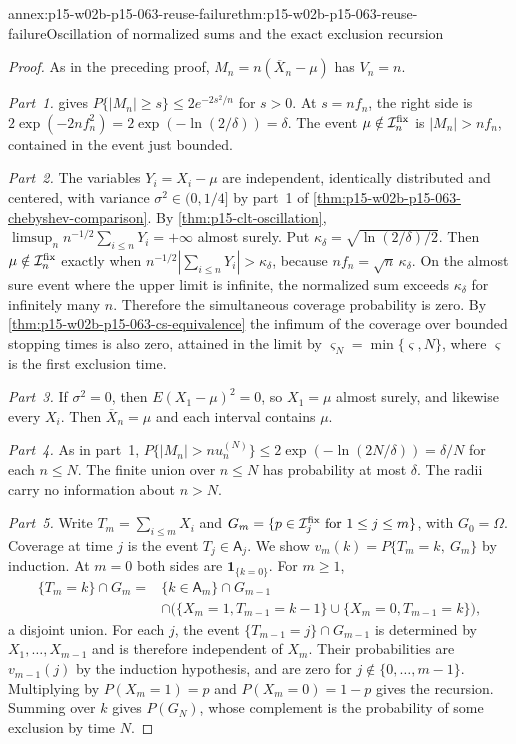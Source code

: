 \begin{annexitem}{annex:p15-w02b-p15-063-reuse-failure}{thm:p15-w02b-p15-063-reuse-failure}{Oscillation of normalized sums and the exact exclusion recursion}
\begin{proof}
As in the preceding proof, \(M_n=n(\overline X_n-\mu)\) has
\(V_n=n\).

\emph{Part~1.}  gives
\(P\{|M_n|\geq s\}\leq2e^{-2s^2/n}\) for \(s>0\). At \(s=nf_n\), the
right side is \(2\exp(-2nf_n^2)=2\exp(-\ln(2/\delta))=\delta\). The event
\(\mu\notin\mathcal I^{\rm fix}_n\) is \(|M_n|>nf_n\), contained in the
event just bounded.

\emph{Part~2.} The variables \(Y_i=X_i-\mu\) are independent, identically
distributed and centered, with variance \(\sigma^2\in(0,1/4]\) by part~1
of \cref{thm:p15-w02b-p15-063-chebyshev-comparison}. By
\cref{thm:p15-clt-oscillation},
\(\limsup_n n^{-1/2}\sum_{i\leq n}Y_i=+\infty\) almost surely. Put
\(\kappa_\delta=\sqrt{\ln(2/\delta)/2}\). Then
\(\mu\notin\mathcal I^{\rm fix}_n\) exactly when
\(n^{-1/2}|\sum_{i\leq n}Y_i|>\kappa_\delta\), because
\(nf_n=\sqrt n\,\kappa_\delta\). On the almost sure event where the upper
limit is infinite, the normalized sum exceeds \(\kappa_\delta\) for
infinitely many \(n\). Therefore the simultaneous coverage probability
is zero. By \cref{thm:p15-w02b-p15-063-cs-equivalence} the infimum of the
coverage over bounded stopping times is also zero, attained in the limit
by \(\varsigma_N=\min\{\varsigma,N\}\), where \(\varsigma\) is the first
exclusion time.

\emph{Part~3.} If \(\sigma^2=0\), then \(E(X_1-\mu)^2=0\), so
\(X_1=\mu\) almost surely, and likewise every \(X_i\). Then
\(\overline X_n=\mu\) and each interval contains \(\mu\).

\emph{Part~4.} As in part~1, \(P\{|M_n|>nu_n^{(N)}\}\leq
2\exp(-\ln(2N/\delta))=\delta/N\) for each \(n\leq N\). The finite union
over \(n\leq N\) has probability at most \(\delta\). The radii carry no
information about \(n>N\).

\emph{Part~5.} Write \(T_m=\sum_{i\leq m}X_i\) and
\(G_m=\{p\in\mathcal I^{\rm fix}_j\text{ for }1\leq j\leq m\}\), with
\(G_0=\Omega\). Coverage at time \(j\) is the event \(T_j\in\mathsf A_j\).
We show \(v_m(k)=P\{T_m=k,\ G_m\}\) by induction. At \(m=0\) both sides
are \(\mathbf1_{\{k=0\}}\). For \(m\geq1\),
\[
\begin{split}
 \{T_m=k\}\cap G_m={}&\{k\in\mathsf A_m\}\cap G_{m-1}\\
 &\cap\bigl(\{X_m=1,T_{m-1}=k-1\}\cup\{X_m=0,T_{m-1}=k\}\bigr),
\end{split}
\]
a disjoint union. For each \(j\), the event
\(\{T_{m-1}=j\}\cap G_{m-1}\) is determined by \(X_1,\ldots,X_{m-1}\) and
is therefore independent of \(X_m\). Their probabilities are
\(v_{m-1}(j)\) by the induction hypothesis, and are zero for
\(j\notin\{0,\ldots,m-1\}\). Multiplying by \(P(X_m=1)=p\) and
\(P(X_m=0)=1-p\) gives the recursion. Summing over \(k\) gives
\(P(G_N)\), whose complement is the probability of some exclusion by
time \(N\).
\end{proof}
\end{annexitem}

